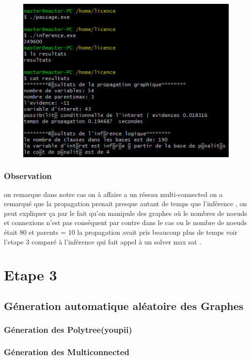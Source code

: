 \documentclass[12pt,a4paper,oneside]{book}
\begin{document}
      		\begin{figure}[H]
      				\centering
      			\includegraphics[scale=1.1]{screens/etape2.png}%
      			\label{labelname}%
      		\end{figure}
        
        
        \subsubsection{Observation}
        on remarque dans notre cas on à affaire a un réseau multi-connected on a remarqué que la propagation prenait presque autant de temps que l'inférence , on peut expliquer ça par le fait qu'on manipule des graphes où le nombres de noeuds et connexions n'est pas conséquent par contre dans le cas ou le nombre de noeuds était 80 et parents = 10 la propagation avait pris beaucoup plus de temps  voir l'etape 3 comparé à l'inférence qui fait appel à un solver max sat .

       
    \section{Etape 3}
    \subsection{Géneration automatique aléatoire des Graphes}
    \subsubsection{Géneration des Polytree(youpii)}
    \subsubsection{Géneration des Multiconnected}
\end{document}
